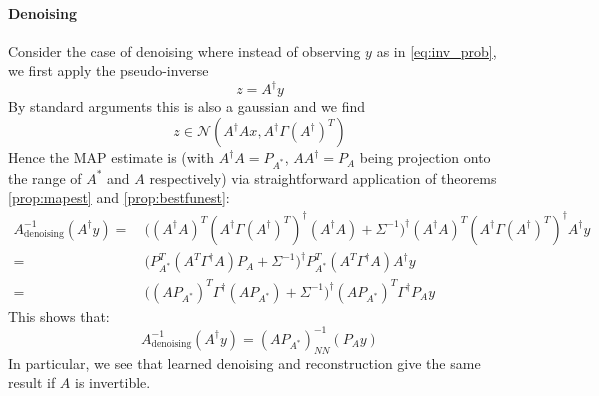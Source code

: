 \documentclass[a4paper,10pt]{article}
\begin{document}
	\paragraph{Denoising}
	
	Consider the case of denoising where instead of observing $y$ as in \ref{eq:inv_prob}, we first apply the pseudo-inverse
	\[
		z = A^\dagger y
	\]
	By standard arguments this is also a gaussian and we find
	\[
		z \in \mathcal{N}(A^\dagger A x, A^\dagger \Gamma ({A^\dagger})^T)
	\]
	Hence the MAP estimate is (with $A^\dagger A = P_{A^*}$, $A A^\dagger = P_{A}$ being projection onto the range of $A^*$ and $A$ respectively) via straightforward application of theorems \ref{prop:mapest} and \ref{prop:bestfunest}:
	\begin{align*}
		A^{-1}_{\text{denoising}}(A^\dagger y) 
		=&\
		\big((A^\dagger A)^T (A^\dagger \Gamma ({A^\dagger})^T)^{\dagger} (A^\dagger A) + \Sigma^{-1}\big)^{\dagger} (A^\dagger A)^T (A^\dagger \Gamma ({A^\dagger})^T)^{\dagger} A^\dagger y
		\\=&\
		\big(P_{A^*}^T (A^T \Gamma^{\dagger} A) P_{A} + \Sigma^{-1}\big)^{\dagger} P_{A^*}^T (A^T \Gamma^\dagger A) A^\dagger y
		\\=&\
		\big((A P_{A^*})^T \Gamma^{\dagger} (A P_{A^*}) + \Sigma^{-1}\big)^{\dagger} (A P_{A^*})^T \Gamma^\dagger P_A y
	\end{align*}
	This shows that:
	\[
		A^{-1}_{\text{denoising}}(A^\dagger y) = (A P_{A^*})^{-1}_{NN}(P_A y)
	\]
	In particular, we see that learned denoising and reconstruction give the same result if $A$ is invertible.

\printbibliography%
	
\end{document}
